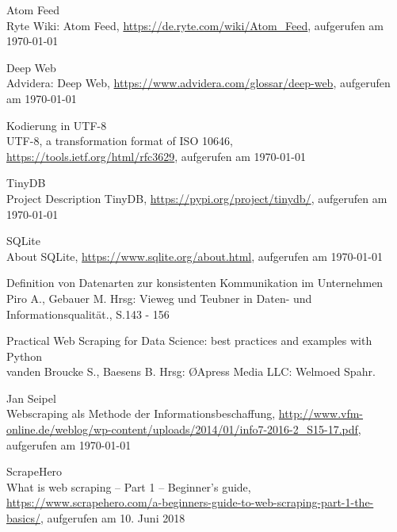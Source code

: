 \documentclass[a4paper,oneside,12pt]{report}
\begin{document}
	\clearpage
	\begin{thebibliography}{9} 
		\vspace{1.0cm}
		
		 Atom Feed\\ Ryte Wiki: Atom Feed, \newline \url{https://de.ryte.com/wiki/Atom_Feed}, aufgerufen am \today
					
		 Deep Web\\ Advidera: Deep Web, \newline \url{https://www.advidera.com/glossar/deep-web}, aufgerufen am \today	
		
		 Kodierung in UTF-8\\ UTF-8, a transformation format of ISO 10646, \newline \url{https://tools.ietf.org/html/rfc3629}, aufgerufen am \today
		
		 TinyDB\\ Project Description TinyDB, \newline \url{https://pypi.org/project/tinydb/}, aufgerufen am \today
		
		 SQLite\\ About SQLite, \newline \url{https://www.sqlite.org/about.html}, aufgerufen am \today
		
		 Definition von Datenarten zur konsistenten Kommunikation im Unternehmen\\ Piro A., Gebauer M. Hrsg: \glqq Vieweg und Teubner in Daten- und Informationsqualität.\grqq, S.143 - 156
		
		 Practical Web Scraping for Data Science: best practices and examples with Python\\ vanden Broucke S., Baesens B. Hrsg: \O Apress Media LLC: Welmoed Spahr.\grqq
		
		 Jan Seipel\\ Webscraping als Methode der Informationsbeschaffung, \newline \url{http://www.vfm-online.de/weblog/wp-content/uploads/2014/01/info7-2016-2\_S15-17.pdf}, aufgerufen am \today
		
		 ScrapeHero\\What is web scraping – Part 1 – Beginner’s guide, \url{https://www.scrapehero.com/a-beginners-guide-to-web-scraping-part-1-the-basics/}, aufgerufen am 10. Juni 2018
		

\end{thebibliography}
\end{document}
